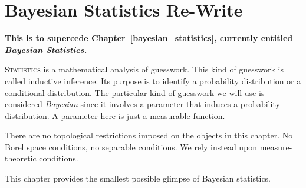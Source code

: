 \documentclass[
twoside=true,
paper=letter,
fontsize=9pt,
pagesize=auto,
leqno,
openany,
headsepline,
overfullrule,
]{scrbook}
\theoremstyle{plain}
\theoremstyle{plain}
\theoremstyle{definition}
\theoremstyle{bfnoteitalic}
\theoremstyle{bfnoteroman}
\begin{document}
\chapter{Bayesian Statistics Re-Write}\label{bayesian_statistics_rewrite}
\textbf{This is to supercede Chapter~\ref{bayesian_statistics},
currently entitled \emph{Bayesian Statistics.}}

\lettrine{S}{tatistics} is a mathematical analysis of guesswork. This kind of guesswork is called inductive inference.
Its purpose is to identify a probability distribution or a conditional distribution. The particular kind of guesswork we will use is considered \emph{Bayesian} since it involves a parameter that induces a  probability distribution. A parameter here is just a measurable function.

There are no topological restrictions imposed on the objects in this chapter. No Borel space conditions, no separable conditions.  We rely instead upon measure-theoretic conditions.

This chapter provides the smallest possible glimpse of Bayesian statistics.
\end{document}
